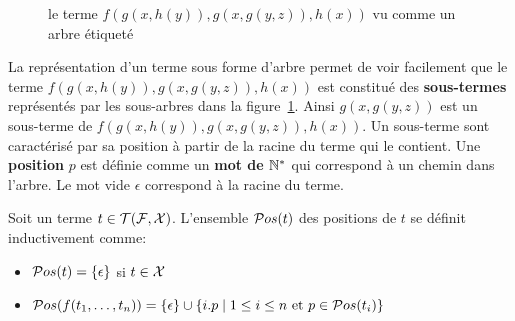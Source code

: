 \begin{figure}[ht!]
  \centering
  \caption{\footnotesize le terme $f(g(x,h(y)), g(x, g(y, z)), h(x))$ vu comme un arbre étiqueté}
  \label{fig:terme-arbre}
\end{figure}

La représentation d'un terme sous forme d'arbre permet de voir
facilement que le terme $f(g(x,h(y)), g(x, g(y, z)), h(x))$ est constitué des \textbf{sous-termes}
représentés par les sous-arbres dans la figure~\ref{fig:terme-arbre}.
Ainsi $g(x, g(y, z))$ est un sous-terme de $f(g(x,h(y)), g(x, g(y, z)), h(x))$.
Un sous-terme sont caractérisé par sa position à partir de la racine du terme
qui le contient. Une \textbf{position} $p$ est définie comme un \textbf{mot de $\mathbb{N}^*$} qui correspond
à un chemin dans l'arbre. Le mot vide $\epsilon$ correspond à la racine du terme.

\begin{definition}
  Soit un terme $t \in \mathcal{T(F, X)}$. L'ensemble $\mathcal{ P}os(t)$ des positions de $t$ se définit inductivement
  comme:
  \begin{itemize}
  \item $\mathcal{ P}os(t)= \{ \epsilon\} $ si $t \in \mathcal X$
  \item $\mathcal{ P}os(f(t_1,\dots,t_n)) = \{ \epsilon \} \cup \{i.p \mid 1 \leq i \leq n
    \mbox{ et } p \in \mathcal{ P}os(t_i) \}$
  \end{itemize}
\end{definition}


